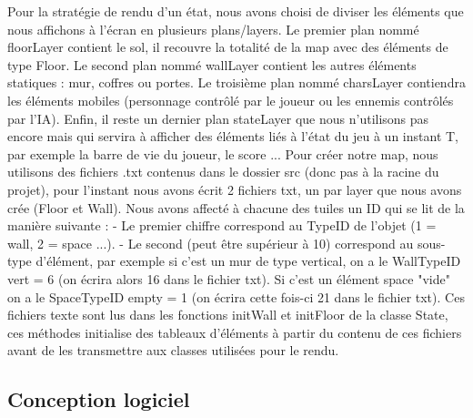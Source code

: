 \documentclass[a4paper,12pt]{article}
\begin{document}
Pour la stratégie de rendu d'un état, nous avons choisi de diviser les éléments que nous affichons à l'écran en plusieurs plans/layers.
\bigbreak
Le premier plan nommé floorLayer contient le sol, il recouvre la totalité de la map avec des éléments de type Floor.
Le second plan nommé wallLayer contient les autres éléments statiques : mur, coffres ou portes.
Le troisième plan nommé charsLayer contiendra les éléments mobiles (personnage contrôlé par le joueur ou les ennemis contrôlés par l'IA).
Enfin, il reste un dernier plan stateLayer que nous n'utilisons pas encore mais qui servira à afficher des éléments liés à l'état du jeu à un instant T, par exemple la barre de vie du joueur, le score ...
\bigbreak
Pour créer notre map, nous utilisons des fichiers .txt contenus dans le dossier src (donc pas à la racine du projet), pour l'instant nous avons écrit 2 fichiers txt, un par layer que nous avons crée (Floor et Wall).
Nous avons affecté à chacune des tuiles un ID qui se lit de la manière suivante :
- Le premier chiffre correspond au TypeID de l'objet (1 = wall, 2 = space ...).
- Le second (peut être supérieur à 10) correspond au sous-type d'élément, par exemple si c'est un mur de type vertical, on a le WallTypeID vert = 6 (on écrira alors 16 dans le fichier txt). Si c'est un élément space "vide" on a le SpaceTypeID empty = 1 (on écrira cette fois-ci 21 dans le fichier txt).
Ces fichiers texte sont lus dans les fonctions initWall et initFloor de la classe State, ces méthodes initialise des tableaux d'éléments à partir du contenu de ces fichiers avant de les transmettre aux classes utilisées pour le rendu.


\subsection{Conception logiciel}
\end{document}
